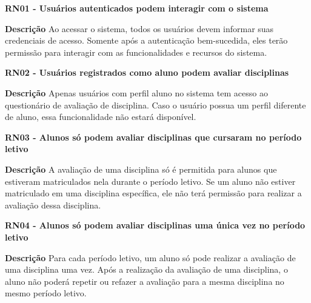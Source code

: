 \begin{description}
  \item \textbf{RN01 - Usuários autenticados podem interagir com o sistema}

  \begin{description}
    \item \textbf{Descrição} Ao acessar o sistema, todos os usuários devem informar suas credenciais de acesso. Somente após a autenticação bem-sucedida, eles terão permissão para interagir com as funcionalidades e recursos do sistema.  
  \end{description}
  

  
  \item \textbf{RN02 - Usuários registrados como aluno podem avaliar disciplinas} 

  \begin{description}
      \item \textbf{Descrição} Apenas usuários com perfil aluno no sistema tem acesso ao questionário de avaliação de disciplina. Caso o usuário possua um perfil diferente de aluno, essa funcionalidade não estará disponível.
  \end{description}
    

    \item \textbf{RN03 - Alunos só podem avaliar disciplinas que cursaram no período letivo} 

    \begin{description}
        \item \textbf{Descrição} A avaliação de uma disciplina só é permitida para alunos que estiveram matriculados nela durante o período letivo. Se um aluno não estiver matriculado em uma disciplina específica, ele não terá permissão para realizar a avaliação dessa disciplina.
    \end{description}
  

    \item \textbf{RN04 - Alunos só podem avaliar disciplinas uma única vez no período letivo} 
        \begin{description}
            \item \textbf{Descrição} Para cada período letivo, um aluno só pode realizar a avaliação de uma disciplina uma vez. Após a realização da avaliação de uma disciplina, o aluno não poderá repetir ou refazer a avaliação para a mesma disciplina no mesmo período letivo.
        \end{description}
  

\end{description}
